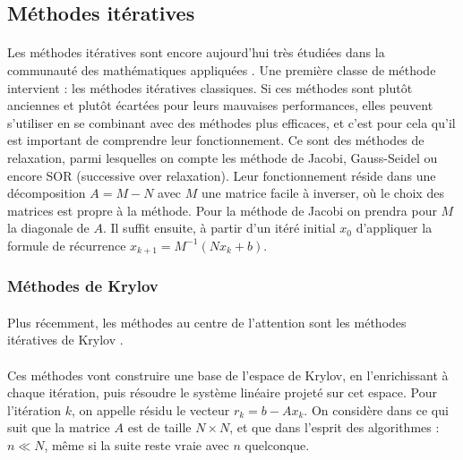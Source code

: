 		\subsection{Méthodes itératives}

			\paragraph{}
			Les méthodes itératives sont encore aujourd'hui très étudiées dans la communauté des mathématiques appliquées \cite{OlshanskiiTyrtyshnikov2014, Saad2003, TrefethenBau1997}.
			Une première classe de méthode intervient : les méthodes itératives classiques.
			Si ces méthodes sont plutôt anciennes et plutôt écartées pour leurs mauvaises performances, elles peuvent s'utiliser en se combinant avec des méthodes plus efficaces, et c'est pour cela qu'il est important de comprendre leur fonctionnement.
			Ce sont des méthodes de relaxation, parmi lesquelles on compte les méthode de Jacobi, Gauss-Seidel ou encore SOR (successive over relaxation).
			Leur fonctionnement réside dans une décomposition $A = M - N$ avec $M$ une matrice facile à inverser, où le choix des matrices est propre à la méthode.
			Pour la méthode de Jacobi on prendra pour $M$ la diagonale de $A$.
			Il suffit ensuite, à partir d'un itéré initial $x_0$ d'appliquer la formule de récurrence $x_{k+1} = M^{-1}\left(Nx_k + b\right)$.



			\subsubsection{Méthodes de Krylov}
		\paragraph{}
		Plus récemment, les méthodes au centre de l'attention sont les méthodes itératives de Krylov
		\cite{TrefethenBau1997, Saad2003, SimonciniSzyld2007, OlshanskiiTyrtyshnikov2014, Vasseur2016}.

		\paragraph{}
		Ces méthodes vont construire une base de l'espace de Krylov, en l'enrichissant à chaque itération, puis résoudre le système linéaire projeté sur cet espace.
		Pour l'itération $k$, on appelle résidu le vecteur $r_k = b - Ax_k$.
		On considère dans ce qui suit que la matrice $A$ est de taille $N\times N$,
		et que dans l'esprit des algorithmes : $n\ll N$, même si la suite reste vraie avec $n$ quelconque.


